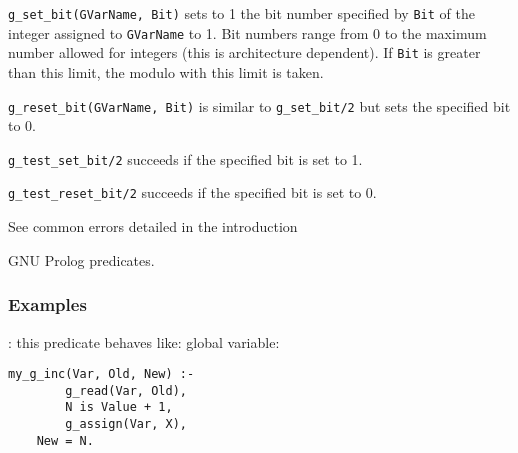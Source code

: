\Description

\texttt{g\_set\_bit(GVarName, Bit)} sets to 1 the bit number specified by
\texttt{Bit} of the integer assigned to \texttt{GVarName} to 1. Bit numbers
range from 0 to the maximum number allowed for integers (this is architecture dependent). If \texttt{Bit} is greater than this limit,
the modulo with this limit is taken.

\texttt{g\_reset\_bit(GVarName, Bit)} is similar to \texttt{g\_set\_bit/2} but
sets the specified bit to 0.

\texttt{g\_test\_set\_bit/2} succeeds if the specified bit is set to 1.

\texttt{g\_test\_reset\_bit/2} succeeds if the specified bit is set to 0.

\Errors

See common errors detailed in the introduction 

\begin{PlErrorsNoTitle}






\end{PlErrorsNoTitle}

\Portability

GNU Prolog predicates.

\subsubsection{Examples}
\label{Examples}

: this predicate behaves like:
global variable:

\begin{Indentation}
\begin{verbatim}
my_g_inc(Var, Old, New) :-
        g_read(Var, Old),
        N is Value + 1,
        g_assign(Var, X),
	New = N.
\end{verbatim}
\end{Indentation}


